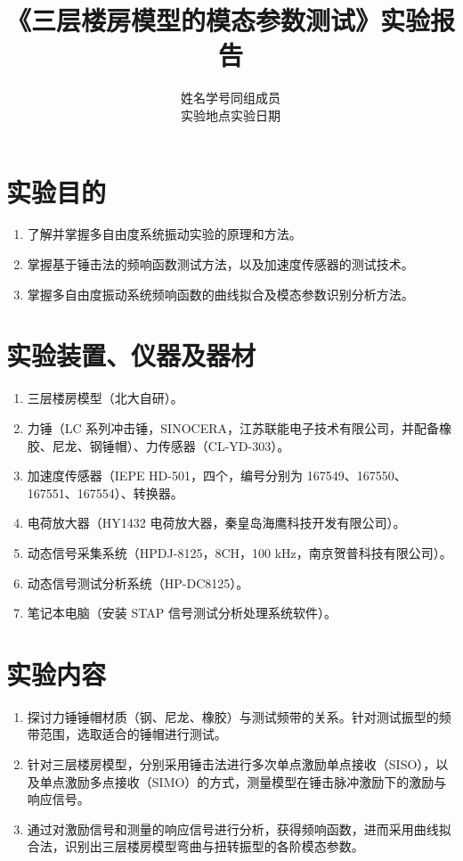 \documentclass[UTF8,a4paper,12pt]{ctexart}
\title{《三层楼房模型的模态参数测试》实验报告}
\author{姓名\blank[2.5cm] \quad 学号\blank[3cm] \quad 同组成员\blank[4cm]\\[1em]
实验地点\blank[3cm] \quad 实验日期\blank[4cm]}
\date{}
\numberwithin{equation}{section}
\begin{document}
\maketitle
\tableofcontents
\clearpage

\section{实验目的}
\begin{enumerate}
  \item 了解并掌握多自由度系统振动实验的原理和方法。
  \item 掌握基于锤击法的频响函数测试方法，以及加速度传感器的测试技术。
  \item 掌握多自由度振动系统频响函数的曲线拟合及模态参数识别分析方法。
\end{enumerate}

\section{实验装置、仪器及器材}
\begin{enumerate}
  \item 三层楼房模型（北大自研）。
  \item 力锤（LC 系列冲击锤，SINOCERA，江苏联能电子技术有限公司，并配备橡胶、尼龙、钢锤帽）、力传感器（CL-YD-303）。
  \item 加速度传感器（IEPE HD-501，四个，编号分别为 167549、167550、167551、167554）、转换器。
  \item 电荷放大器（HY1432 电荷放大器，秦皇岛海鹰科技开发有限公司）。
  \item 动态信号采集系统（HPDJ-8125，8CH，100 kHz，南京贺普科技有限公司）。
  \item 动态信号测试分析系统（HP-DC8125）。
  \item 笔记本电脑（安装 STAP 信号测试分析处理系统软件）。
\end{enumerate}

\section{实验内容}
\begin{enumerate}
  \item 探讨力锤锤帽材质（钢、尼龙、橡胶）与测试频带的关系。针对测试振型的频带范围，选取适合的锤帽进行测试。
  \item 针对三层楼房模型，分别采用锤击法进行多次单点激励单点接收（SISO），以及单点激励多点接收（SIMO）的方式，测量模型在锤击脉冲激励下的激励与响应信号。
  \item 通过对激励信号和测量的响应信号进行分析，获得频响函数，进而采用曲线拟合法，识别出三层楼房模型弯曲与扭转振型的各阶模态参数。
\end{enumerate}
\end{document}

